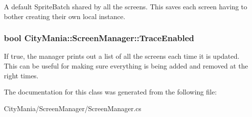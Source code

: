 A default SpriteBatch shared by all the screens. This saves each screen having to bother creating their own local instance. \hypertarget{classCityMania_1_1ScreenManager_a1891dddceb1d3536129a0ae4689bb406}{
\subsubsection[{TraceEnabled}]{\setlength{\rightskip}{0pt plus 5cm}bool CityMania::ScreenManager::TraceEnabled}}
\label{classCityMania_1_1ScreenManager_a1891dddceb1d3536129a0ae4689bb406}


If true, the manager prints out a list of all the screens each time it is updated. This can be useful for making sure everything is being added and removed at the right times. 

The documentation for this class was generated from the following file:\begin{DoxyCompactItemize}
\item 
CityMania/ScreenManager/ScreenManager.cs\end{DoxyCompactItemize}
